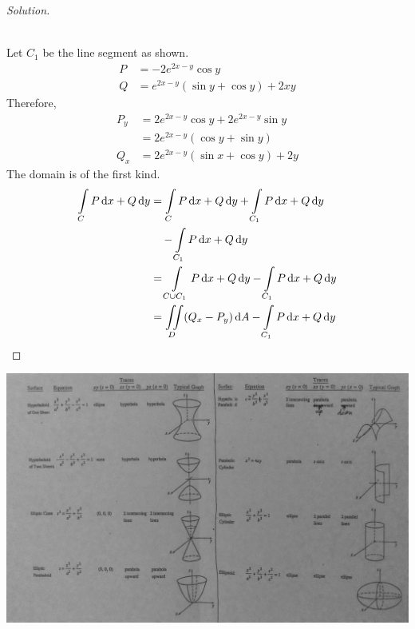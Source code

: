 \documentclass[fleqn, a4paper, 10pt]{article}
\theoremstyle{definition}
\theoremstyle{theorem}
\theoremstyle{remark}
\newenvironment{solution}
	{\begin{proof}[Solution]\let\qed\relax}
	{\end{proof}}
\begin{document}
\begin{multicols}{2}
\begin{solution}
	~\\
	\\
	Let $C_1$ be the line segment as shown.
	\begin{align*}
		P &= -2e^{2x - y} \cos y\\
		Q &= e^{2x - y} (\sin y + \cos y) + 2xy
	\end{align*}
	Therefore,
	\begin{align*}
		P_y &= 2e^{2x - y} \cos y + 2e^{2x - y} \sin y \\
		&= 2 e^{2x - y} (\cos y + \sin y)\\
		Q_x &= 2e^{2x - y} (\sin x + \cos y) + 2y
	\end{align*}
	The domain is of the first kind.
	\begin{align*}
		\int\limits_{C} P \dif x + Q \dif y &= \int\limits_{C} P \dif x + Q \dif y + \int\limits_{C_1} P \dif x + Q \dif y\\
		&\quad - \int\limits_{C_1} P \dif x + Q \dif y\\
		&= \int\limits_{C \cup C_1} P \dif x + Q \dif y - \int\limits_{C_1} P \dif x + Q \dif y\\
		&= \iint\limits_{D} (Q_x - P_y) \dif A - \int\limits_{C_1} P \dif x + Q \dif y
	\end{align*}
\end{solution}

\end{multicols}

\includegraphics[width = \textheight, angle = -90]{IMG_5498_bw.JPG}
\end{document}
